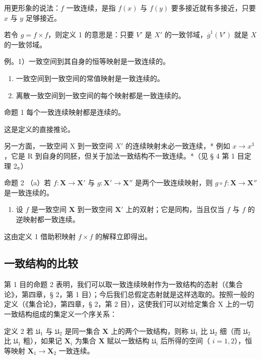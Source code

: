 用更形象的说法：\(f\) 一致连续，是指 \(f(x)\) 与 \(f(y)\) 要多接近就有多接近，只要 \(x\) 与 \(y\) 足够接近。

若令 \(g = f \times f\)，则定义 1 的意思是：只要 \(V'\) 是 \(X'\) 的一致邻域，\(\overline{g}^1(V')\) 就是 \(X\) 的一致邻域。

例。1）一致空间到其自身的恒等映射是一致连续的。

\begin{enumerate}
\def\labelenumi{\arabic{enumi})}
\setcounter{enumi}{1}
\item
  一致空间到一致空间的常值映射是一致连续的。
\item
  离散一致空间到一致空间的每个映射都是一致连续的。
\end{enumerate}

命题 1 每个一致连续映射都是连续的。

这是定义的直接推论。

另一方面，一致空间 X 到一致空间 \(X'\) 的连续映射未必一致连续，* 例如 \(x \to x^{3}\)，它是 R 到自身的同胚，但关于加法一致结构不一致连续。*（见 § 4 第 1 目定理 2。）

命题 2 （a）若 \(f: \mathbf{X} \to \mathbf{X}'\) 与 \(g: \mathbf{X}' \to \mathbf{X}''\) 是两个一致连续映射，则 \(g \circ f: \mathbf{X} \to \mathbf{X}''\) 是一致连续的。

\begin{enumerate}
\def\labelenumi{(\alph{enumi})}
\setcounter{enumi}{1}
\tightlist
\item
  设 \(f\) 是一致空间 \(\mathbf{X}\) 到一致空间 \(\mathbf{X}'\) 上的双射；它是同构，当且仅当 \(f\) 与 \(f\) 的逆映射都一致连续。
\end{enumerate}

这由定义 1 借助积映射 \(f \times f\) 的解释立即得出。

\subsection{一致结构的比较}

第 1 目的命题 2 表明，我们可以取一致连续映射作为一致结构的态射（《集合论》，第四章，§ 2，第 1 目）；今后我们总假定态射就是这样选取的。按照一般的定义（《集合论》，第四章，§ 2，第 2 目），这使我们可以对给定集合 X 上的一切一致结构组成的集定义一个序关系：

定义 2 若 \(\mathfrak{U}_1\) 与 \(\mathfrak{U}_2\) 是同一集合 \(\mathbf{X}\) 上的两个一致结构，则称 \(\mathfrak{U}_1\) 比 \(\mathfrak{U}_2\) 细（而 \(\mathfrak{U}_2\) 比 \(\mathfrak{U}_1\) 粗），如果记 \(\mathbf{X}_i\) 为集合 \(\mathbf{X}\) 赋以一致结构 \(\mathfrak{U}_i\) 后所得的空间（ \(i = 1,2\)），恒等映射 \(\mathbf{X}_1 \to \mathbf{X}_2\) 一致连续。

